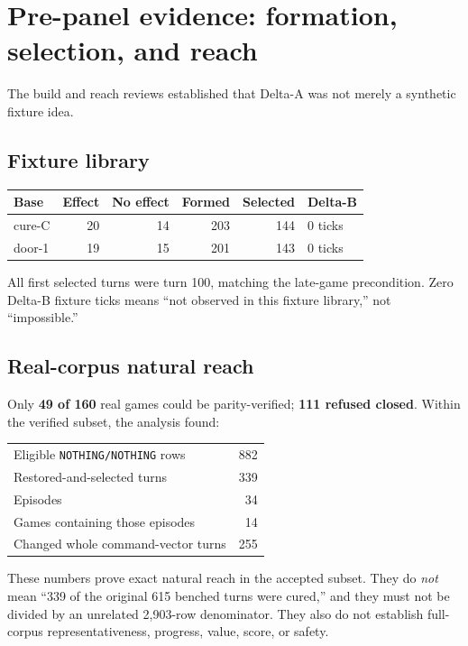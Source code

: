 \documentclass[10pt,a4paper]{article}
\newcommand{\code}[1]{\texttt{#1}}
\begin{document}
\section{Pre-panel evidence: formation, selection, and reach}

The build and reach reviews established that Delta-A was not merely a synthetic fixture idea.

\subsection{Fixture library}

\begin{tabularx}{\textwidth}{@{}p{24mm}rrrrY@{}}
\toprule
\textbf{Base} & \textbf{Effect} & \textbf{No effect} & \textbf{Formed} & \textbf{Selected} & \textbf{Delta-B} \\
\midrule
cure-C & 20 & 14 & 203 & 144 & 0 ticks \\
door-1 & 19 & 15 & 201 & 143 & 0 ticks \\
\bottomrule
\end{tabularx}

All first selected turns were turn 100, matching the late-game precondition. Zero Delta-B fixture
ticks means ``not observed in this fixture library,'' not ``impossible.''

\subsection{Real-corpus natural reach}

Only \textbf{49 of 160} real games could be parity-verified; \textbf{111 refused closed}. Within
the verified subset, the analysis found:

\begin{center}
\begin{tabular}{@{}lr@{}}
\toprule
Eligible \code{NOTHING/NOTHING} rows & 882 \\
Restored-and-selected turns & 339 \\
Episodes & 34 \\
Games containing those episodes & 14 \\
Changed whole command-vector turns & 255 \\
\bottomrule
\end{tabular}
\end{center}

These numbers prove exact natural reach in the accepted subset. They do \emph{not} mean
``339 of the original 615 benched turns were cured,'' and they must not be divided by an unrelated
2,903-row denominator. They also do not establish full-corpus representativeness, progress, value,
score, or safety.
\end{document}
